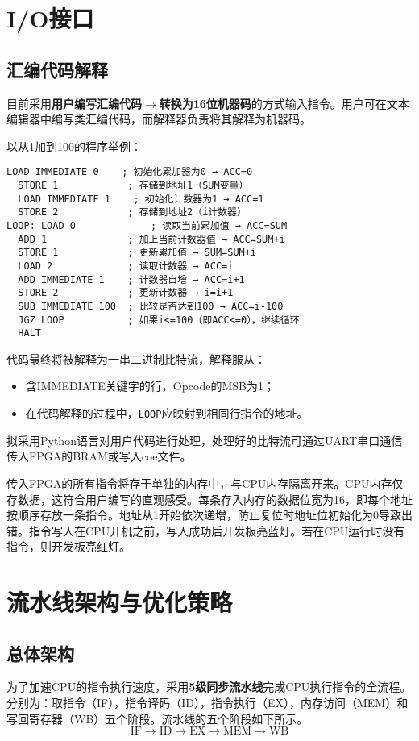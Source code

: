 \documentclass[lang=cn,a4paper,newtx]{elegantpaper}
\begin{document}
\section{I/O接口}
\subsection{汇编代码解释}
目前采用\textbf{用户编写汇编代码}$\to$\textbf{转换为16位机器码}的方式输入指令。用户可在文本编辑器中编写类汇编代码，而解释器负责将其解释为机器码。

以从1加到100的程序举例：
\begin{lstlisting}[language=Assembly]
  LOAD IMMEDIATE 0    ; 初始化累加器为0 → ACC=0
  STORE 1            ; 存储到地址1（SUM变量）
  LOAD IMMEDIATE 1    ; 初始化计数器为1 → ACC=1
  STORE 2            ; 存储到地址2（i计数器）
LOOP: LOAD 0             ; 读取当前累加值 → ACC=SUM
  ADD 1              ; 加上当前计数器值 → ACC=SUM+i
  STORE 1            ; 更新累加值 → SUM=SUM+i
  LOAD 2             ; 读取计数器 → ACC=i
  ADD IMMEDIATE 1    ; 计数器自增 → ACC=i+1
  STORE 2            ; 更新计数器 → i=i+1
  SUB IMMEDIATE 100  ; 比较是否达到100 → ACC=i-100
  JGZ LOOP           ; 如果i<=100（即ACC<=0），继续循环
  HALT
\end{lstlisting}

代码最终将被解释为一串二进制比特流，解释服从：
\begin{itemize}
  \item 含IMMEDIATE关键字的行，Opcode的MSB为1；
  \item 在代码解释的过程中，\texttt{LOOP}应映射到相同行指令的地址。
\end{itemize}

拟采用Python语言对用户代码进行处理，处理好的比特流可通过UART串口通信传入FPGA的BRAM或写入coe文件。

传入FPGA的所有指令将存于单独的内存中，与CPU内存隔离开来。CPU内存仅存数据，这符合用户编写的直观感受。每条存入内存的数据位宽为16，即每个地址按顺序存放一条指令。地址从1开始依次递增，防止复位时地址位初始化为0导致出错。指令写入在CPU开机之前，写入成功后开发板亮蓝灯。若在CPU运行时没有指令，则开发板亮红灯。
\section{流水线架构与优化策略}
\subsection{总体架构}
为了加速CPU的指令执行速度，采用\textbf{5级同步流水线}完成CPU执行指令的全流程。分别为：取指令（IF），指令译码（ID），指令执行（EX），内存访问（MEM）和写回寄存器（WB）五个阶段。流水线的五个阶段如下所示。
$$
  \text{IF} \rightarrow \text{ID} \rightarrow \text{EX} \rightarrow \text{MEM} \rightarrow \text{WB}
$$
\end{document}
